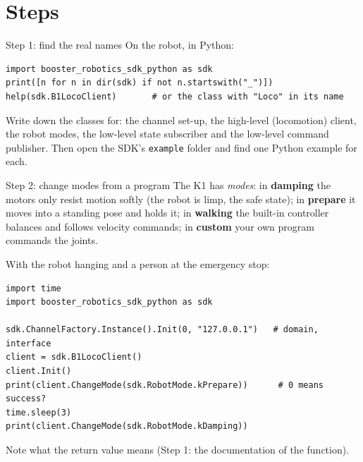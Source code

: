 \begin{center}
\end{center}

\section*{Steps}
\begin{stepbox}{Step 1: find the real names}
On the robot, in Python:
\begin{verbatim}
import booster_robotics_sdk_python as sdk
print([n for n in dir(sdk) if not n.startswith("_")])
help(sdk.B1LocoClient)       # or the class with "Loco" in its name
\end{verbatim}
Write down the classes for: the channel set-up, the high-level (locomotion) client, the robot modes, the low-level state subscriber and the low-level command publisher. Then open the SDK's \texttt{example} folder and find one Python example for each.
\end{stepbox}

\begin{stepbox}{Step 2: change modes from a program}
The K1 has \emph{modes}\guess: in \textbf{damping} the motors only resist motion softly (the robot is limp, the safe state); in \textbf{prepare} it moves into a standing pose and holds it; in \textbf{walking} the built-in controller balances and follows velocity commands; in \textbf{custom} your own program commands the joints.

With the robot hanging and a person at the emergency stop:
\begin{verbatim}
import time
import booster_robotics_sdk_python as sdk

sdk.ChannelFactory.Instance().Init(0, "127.0.0.1")   # domain, interface
client = sdk.B1LocoClient()
client.Init()
print(client.ChangeMode(sdk.RobotMode.kPrepare))      # 0 means success?
time.sleep(3)
print(client.ChangeMode(sdk.RobotMode.kDamping))
\end{verbatim}
Note what the return value means (Step 1: the documentation of the function).
\end{stepbox}


